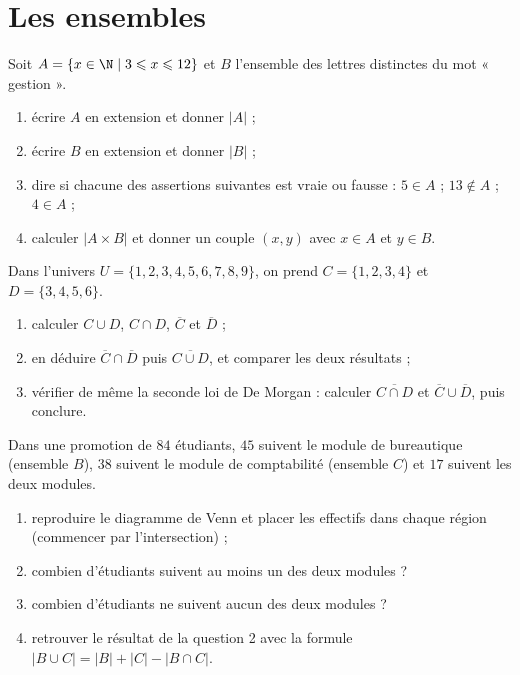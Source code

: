 \chapter{Les ensembles}

\begin{exercice}
Soit $A = \{x \in \N \mid 3 \leqslant x \leqslant 12\}$ et $B$ l'ensemble des lettres distinctes du mot « gestion ».
\begin{enumerate}
\item écrire $A$ en extension et donner $|A|$ ;
\item écrire $B$ en extension et donner $|B|$ ;
\item dire si chacune des assertions suivantes est vraie ou fausse : $5 \in A$ ; $13 \notin A$ ; $4 \in A$ ;
\item calculer $|A \times B|$ et donner un couple $(x, y)$ avec $x \in A$ et $y \in B$.
\end{enumerate}
\end{exercice}

\begin{exercice}
Dans l'univers $U = \{1, 2, 3, 4, 5, 6, 7, 8, 9\}$, on prend $C = \{1, 2, 3, 4\}$ et $D = \{3, 4, 5, 6\}$.
\begin{enumerate}
\item calculer $C \cup D$, $C \cap D$, $\overline{C}$ et $\overline{D}$ ;
\item en déduire $\overline{C} \cap \overline{D}$ puis $\overline{C \cup D}$, et comparer les deux résultats ;
\item vérifier de même la seconde loi de De Morgan : calculer $\overline{C \cap D}$ et $\overline{C} \cup \overline{D}$, puis conclure.
\end{enumerate}
\end{exercice}

\begin{exercice}
Dans une promotion de $84$ étudiants, $45$ suivent le module de bureautique (ensemble $B$), $38$ suivent le module de comptabilité (ensemble $C$) et $17$ suivent les deux modules.
\begin{enumerate}
\item reproduire le diagramme de Venn et placer les effectifs dans chaque région (commencer par l'intersection) ;
\item combien d'étudiants suivent au moins un des deux modules ?
\item combien d'étudiants ne suivent aucun des deux modules ?
\item retrouver le résultat de la question 2 avec la formule $|B \cup C| = |B| + |C| - |B \cap C|$.
\end{enumerate}
\end{exercice}

